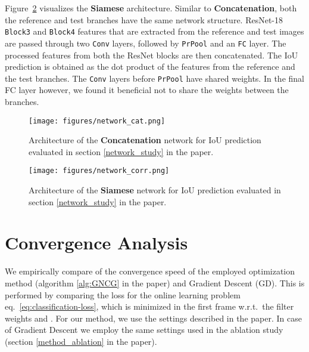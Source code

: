 \documentclass[10pt,twocolumn,letterpaper]{article}
\begin{document}
	Figure~\ref{fig:network_siam} visualizes the \textbf{Siamese} architecture. Similar to \textbf{Concatenation}, both the reference and test branches have the same network structure. ResNet-18 \texttt{Block3} and  \texttt{Block4} features that are extracted from the reference and test images are passed through two \texttt{Conv} layers, followed by \texttt{PrPool} and an \texttt{FC} layer. The processed features from both the ResNet blocks are then concatenated. The IoU prediction is obtained as the dot product of the features from the reference and the test branches. The \texttt{Conv} layers before \texttt{PrPool} have shared weights. In the final FC layer however, we found it beneficial not to share the weights between the branches. 
	
	\begin{figure}[t]
		\centering
		\texttt{[image: figures/network\_cat.png]}\vspace{-1mm}
		\vspace{-3mm}
		\caption{Architecture of the \textbf{Concatenation} network for IoU prediction evaluated in section \ref{network_study} in the paper.}
		\label{fig:network_cat}
	\end{figure}
	
	\begin{figure}[t]
		\centering
		\texttt{[image: figures/network\_corr.png]}\vspace{-1mm}
		\vspace{-3mm}
		\caption{Architecture of the \textbf{Siamese} network for IoU prediction evaluated in section \ref{network_study} in the paper.}
		\label{fig:network_siam}
	\end{figure}

\section{Convergence Analysis}
\label{sec:convergence}

We empirically compare of the convergence speed of the employed optimization method (algorithm \ref{alg:GNCG} in the paper) and Gradient Descent (GD). This is performed by comparing the loss for the online learning problem  eq.\ \eqref{eq:classification-loss}, which is minimized in the first frame w.r.t.\ the filter weights  and . For our method, we use the settings described in the paper. In case of Gradient Descent we employ the same settings used in the ablation study (section \ref{method_ablation} in the paper).
\end{document}
